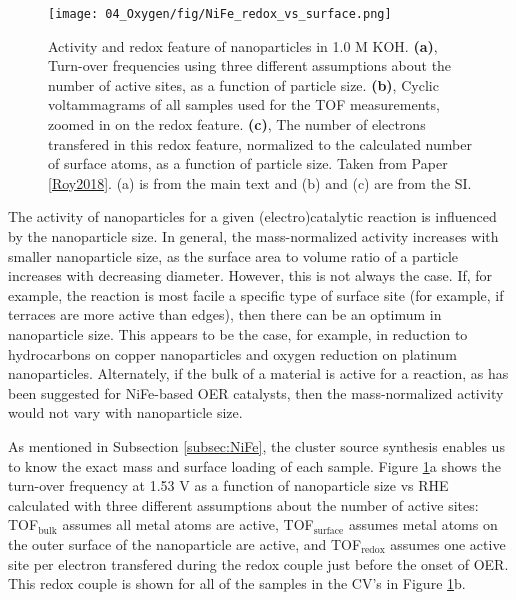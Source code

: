 \begin{figure}[h!]
	\centering
	\texttt{[image: 04\_Oxygen/fig/NiFe\_redox\_vs\_surface.png]}
	\caption{Activity and redox feature of  nanoparticles in 1.0 M KOH. \textbf{(a)}, Turn-over frequencies using three different assumptions about the number of active sites, as a function of particle size. \textbf{(b)}, Cyclic voltammagrams of all samples used for the TOF measurements, zoomed in on the redox feature. \textbf{(c)}, The number of electrons transfered in this redox feature, normalized to the calculated number of surface atoms, as a function of particle size. Taken from Paper \ref{Roy2018}. (a) is from the main text and (b) and (c) are from the SI.}
	\label{fig:redox_vs_surf}
\end{figure}

The activity of nanoparticles for a given (electro)catalytic reaction is influenced by the nanoparticle size\cite{Mistry2016b}. In general, the mass-normalized activity increases with smaller nanoparticle size, as the surface area to volume ratio of a particle increases with decreasing diameter. However, this is not always the case. If, for example, the reaction is most facile a specific type of surface site (for example, if terraces are more active than edges), then there can be an optimum in nanoparticle size. This appears to be the case, for example, in  reduction to hydrocarbons on copper nanoparticles\cite{Reske2014} and oxygen reduction on platinum nanoparticles\cite{Hernandez-Fernandez2014}. Alternately, if the bulk of a material is active for a reaction, as has been suggested for NiFe-based OER catalysts\cite{Batchellor2015, Doyle2017}, then the mass-normalized activity would not vary with nanoparticle size.

As mentioned in Subsection \ref{subsec:NiFe}, the cluster source synthesis enables us to know the exact mass and surface loading of each sample. Figure \ref{fig:redox_vs_surf}a shows the turn-over frequency at 1.53 V as a function of nanoparticle size vs RHE calculated with three different assumptions about the number of active sites: TOF$_{\text{bulk}}$ assumes all metal atoms are active, TOF$_{\text{surface}}$ assumes metal atoms on the outer surface of the nanoparticle are active, and TOF$_{\text{redox}}$ assumes one active site per electron transfered during the  redox couple just before the onset of OER. This redox couple is shown for all of the samples in the CV's in Figure \ref{fig:redox_vs_surf}b.

